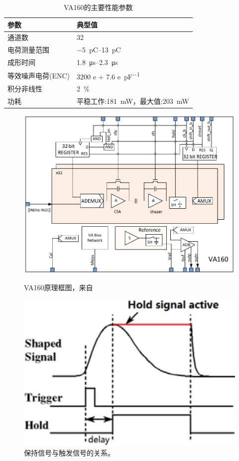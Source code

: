 \begin{table}[h]
	\centering
	\caption{VA160的主要性能参数}
	\label{tab:ch2:va160}
	
	\begin{tabulary}{0.7\linewidth}{Ll}
		\toprule[1.5pt]
		\textbf{参数} &                     \textbf{典型值}                       \\ 
		\midrule[1pt]
		通道数         &                          32                            \\
		电荷测量范围      &           \SIrange{-5}{13}{\pico\coulomb}            \\
		成形时间        &          \SIrange{1.8}{2.3}{\micro\second}            \\
		等效噪声电荷(ENC) &       3200 \si{e} + 7.6 \si{e\per\pico\farad}          \\
		积分非线性       &                   \SI{2}{\percent}                     \\
		功耗          & 平稳工作:\SI{181}{\milli\watt}，最大值:\SI{203}{\milli\watt}   \\ 
		\bottomrule[1.5pt]
	\end{tabulary}
\end{table}

\begin{figure}[t]
	\centering
	\includegraphics[width=0.8\linewidth]{chap/description/fig/va160}
	\caption{VA160原理框图，来自~\parencite{fengchangqing_eqm}}
	\label{fig:ch2:va160}
	
	\centering
	\includegraphics[width=0.5\linewidth]{chap/description/fig/sample_hold}
	\caption{保持信号与触发信号的关系。}
	\label{fig:ch2:sample_hold}
\end{figure}

